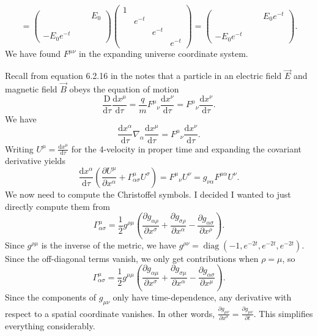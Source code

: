\documentclass[11pt, letterpaper]{article}
\theoremstyle{plain}
\begin{document}
\[
	=\begin{pmatrix}
	 &  &  & E_0 \\
	 &  &  &  \\
	 &  &  &  \\
	-E_0e^{-t}  &  &  & 
	\end{pmatrix}\begin{pmatrix}
	1 &  &  &  \\
	 & e^{-t}  &  &  \\
	 &  & e^{-t}  &  \\
	 &  &  & e^{-t} 
	\end{pmatrix}=\begin{pmatrix}
	 &  &  & E_0e^{-t}  \\
	 &  &  &  \\
	 &  &  &  \\
	-E_0e^{-t}  &  &  & 
	\end{pmatrix}
.\]
We have found $F^{\mu \nu } $ in the expanding universe coordinate system.

Recall from equation 6.2.16 in the notes that a particle in an electric field $\vec{E} $ and magnetic field $\vec{B} $ obeys the equation of motion
\[
	\frac{\mathrm{D} }{\mathrm{d} \tau } \frac{\mathrm{d}x^\mu }{\mathrm{d}\tau } =\frac{q}{m} F^\mu\!_\nu \frac{\mathrm{d}x^\nu }{\mathrm{d}\tau } =F^\mu \!_\nu \frac{\mathrm{d}x^\nu }{\mathrm{d}\tau } 
.\]
We have
\[
	\frac{\mathrm{d}x^\alpha }{\mathrm{d}\tau  } \nabla_\alpha \frac{\mathrm{d}x^\mu }{\mathrm{d}\tau }=F^\mu \!_\nu \frac{\mathrm{d}x^\nu }{\mathrm{d}\tau } 
.\]
Writing $U^\mu =\frac{\mathrm{d}x^\mu }{\mathrm{d}\tau } $ for the 4-velocity in proper time and expanding the covariant derivative yields
\[
	\frac{\mathrm{d}x^\alpha }{\mathrm{d}\tau } \left( \frac{\partial U^\mu }{\partial x^\alpha } +\Gamma ^\mu_{\alpha \sigma } U^\sigma  \right) =F^\mu \!_\nu U^\nu =g_{\nu \alpha } F^{\mu \alpha } U^\nu 
.\]
We now need to compute the Christoffel symbols. I decided I wanted to just directly compute them from
\[
	\Gamma_{\alpha \sigma } ^\mu= \frac{1}{2} g^{\rho \mu } \left( \frac{\partial g_{\alpha \rho } }{\partial x^\sigma } +\frac{\partial g_{\sigma \rho } }{\partial x^\alpha } -\frac{\partial g_{\alpha \sigma } }{\partial x^\rho }  \right) 
.\]
Since $g^{\rho \mu } $ is the inverse of the metric, we have $g^{\rho \nu } =\operatorname{diag} (-1,e^{-2t} ,e^{-2t} ,e^{-2t} )$. Since the off-diagonal terms vanish, we only get contributions when $\rho =\mu $, so
\[
	\Gamma^\mu_{\alpha \sigma } =\frac{1}{2} g^{\mu \mu } \left( \frac{\partial g_{\alpha \mu } }{\partial x^\sigma } +\frac{\partial g_{\sigma \mu } }{\partial x^\alpha } -\frac{\partial g_{\alpha \sigma } }{\partial x^\mu }  \right) 
.\]
Since the components of $g_{\mu \nu } $ only have time-dependence, any derivative with respect to a spatial coordinate vanishes. In other words, $\frac{\partial g_{\mu \nu } }{\partial x^\sigma } =\frac{\partial g_{\mu \nu } }{\partial t} $. This simplifies everything considerably.
\end{document}
